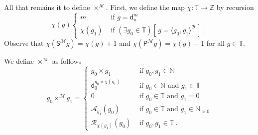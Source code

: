 \documentclass[10pt,a4paper, openany,  oldfontcommands]{memoir}
\newtheorem{open problem} [theorem] {Open Problem}
\newtheorem{open question} [theorem] {Open Question}
\renewcommand{\mathrm}{\mathsf}
\begin{document}
All that remains it to define   $  \times^{  \mathcal{M}  } $. 
First,   we define the map  $   \chi :  \mathbb{T}  \to   \mathbb{Z}  $  by recursion 
\[
\chi  \left( g  \right)    \begin{cases}
m                 &      \mbox{  if   }  g =  \mathsf{d}^m_n     
\\
\chi  \left( g_1  \right)     
&    \mbox{  if   }    \left(  \exists  g_0  \in  \mathbb{T}  \right)  \left[   \,   g =  \langle g_0, g_1  \rangle^{  \mathcal{B}   }   \,    \right]   
\      .
\end{cases}
\]
Observe that     $  \chi  \left(  \mathrm{S}^{  \mathcal{M}  } g  \right)       =    \chi  \left( g  \right)      +1  $
and   $  \chi  \left(  \mathrm{P}^{  \mathcal{M}  } g  \right)       =    \chi  \left( g  \right)      - 1  $
  for all $  g  \in  \mathbb{T}  $. 





We define    $   \times^{  \mathcal{M}  }   $  as follows 
\[
g_0 \times^{  \mathcal{M}  }   g_1   =   \begin{cases}
g_0 \times  g_1       &    \mbox{  if  }   g_0, g_1  \in  \mathbb{N} 
\\
\mathsf{d}_0^{   g_0   \times  \chi \left(  g_1  \right)  }          &    \mbox{  if  }   g_0  \in  \mathbb{N}   \mbox{  and  }    g_1  \in  \mathbb{T}
\\ 
0             &  \mbox{  if  }    g_0  \in  \mathbb{T}    \mbox{  and   }   g_1  =  0 
\\
\mathcal{A}_{ g_1  }  \left(  g_0  \right)    &    \mbox{  if  }    g_0  \in  \mathbb{T}    \mbox{  and   }    g_1    \in    \mathbb{N}_{ >0 }
 \\
 \mathcal{R}_{   \chi  \left( g_1  \right)  }   \left(   g_0    \right)                  & \mbox{  if  }     g_0, g_1  \in  \mathbb{T}
 \         .
\end{cases}
\]
\end{document}

